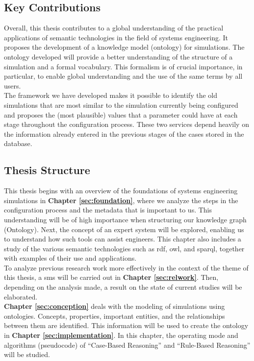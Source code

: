 \subsection{Key Contributions}
Overall, this thesis contributes to a global understanding of the practical applications of semantic technologies in the field of systems engineering. It proposes the development of a knowledge model (ontology) for simulations. The ontology developed will provide a better understanding of the structure of a simulation and a formal vocabulary. This formalism is of crucial importance, in particular, to enable global understanding and the use of the same terms by all users.\\

The framework we have developed makes it possible to identify the old simulations that are most similar to the simulation currently being configured and proposes the (most plausible) values that a parameter could have at each stage throughout the configuration process. These two services depend heavily on the information already entered in the previous stages of the cases stored in the database.


\subsection{Thesis Structure}
This thesis begins with an overview of the foundations of systems engineering simulations in \textbf{Chapter \ref{sec:foundation}}, where we analyze the steps in the configuration process and the metadata that is important to us. This understanding will be of high importance when structuring our knowledge graph (Ontology). Next, the concept of an expert system will be explored, enabling us to understand how such tools can assist engineers. This chapter also includes a study of the various semantic technologies such as \acrshort{rdf}, \acrshort{owl}, and \acrshort{sparql}, together with examples of their use and applications. \\

To analyze previous research work more effectively in the context of the theme of this thesis, a \acrfull{sms} will be carried out in \textbf{Chapter \ref{sec:relwork}}. Then, depending on the analysis made, a result on the state of current studies will be elaborated.\\

\textbf{Chapter \ref{sec:conception}} deals with the modeling of simulations using ontologies. Concepts, properties, important entities, and the relationships between them are identified. This information will be used to create the ontology in \textbf{Chapter \ref{sec:implementation}}. In this chapter, the operating mode and algorithms (pseudocode) of “Case-Based Reasoning” and “Rule-Based Reasoning” will be studied. \\


